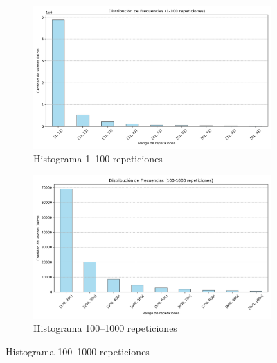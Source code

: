 \begin{figure}[htbp]
    \centering
    \begin{subfigure}[t]{0.48\textwidth-1em}
        \includegraphics[width=\linewidth]{img/histograma_1_100.png}
        \caption{Histograma 1–100 repeticiones}
        \label{fig:sub1}
    \end{subfigure}
    \hfill
    \begin{subfigure}[t]{0.48\textwidth-1em}
        \includegraphics[width=\linewidth]{img/histograma_100_1000.png}
        \caption{Histograma 100–1000 repeticiones}
        \label{fig:sub2}
    \end{subfigure}

    \vspace{0.5cm}


\end{figure}
